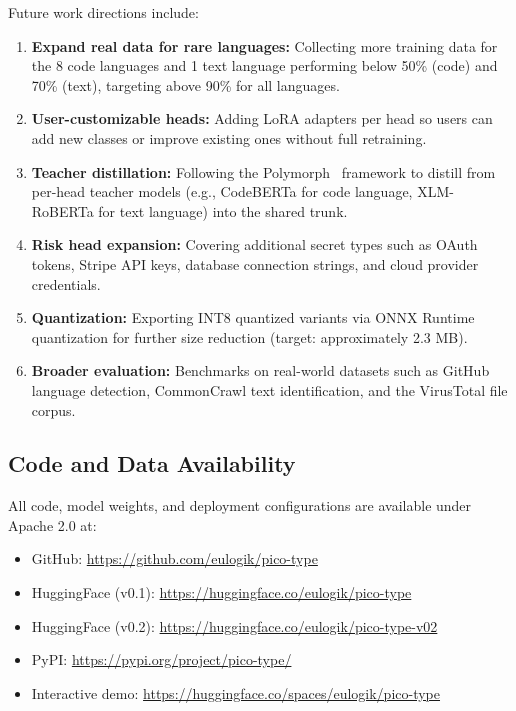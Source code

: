 \documentclass[11pt,a4paper]{article}
\begin{document}
Future work directions include:

\begin{enumerate}[noitemsep]
  \item \textbf{Expand real data for rare languages:} Collecting more training data for the 8 code languages and 1 text language performing below 50\% (code) and 70\% (text), targeting above 90\% for all languages.
  \item \textbf{User-customizable heads:} Adding LoRA adapters per head so users can add new classes or improve existing ones without full retraining.
  \item \textbf{Teacher distillation:} Following the Polymorph~\cite{polymorph} framework to distill from per-head teacher models (e.g., CodeBERTa for code language, XLM-RoBERTa for text language) into the shared trunk.
  \item \textbf{Risk head expansion:} Covering additional secret types such as OAuth tokens, Stripe API keys, database connection strings, and cloud provider credentials.
  \item \textbf{Quantization:} Exporting INT8 quantized variants via ONNX Runtime quantization for further size reduction (target: approximately 2.3 MB).
  \item \textbf{Broader evaluation:} Benchmarks on real-world datasets such as GitHub language detection, CommonCrawl text identification, and the VirusTotal file corpus.
\end{enumerate}

\subsection*{Code and Data Availability}

All code, model weights, and deployment configurations are available under Apache 2.0 at:
\begin{itemize}[noitemsep]
  \item GitHub: \url{https://github.com/eulogik/pico-type}
  \item HuggingFace (v0.1): \url{https://huggingface.co/eulogik/pico-type}
  \item HuggingFace (v0.2): \url{https://huggingface.co/eulogik/pico-type-v02}
  \item PyPI: \url{https://pypi.org/project/pico-type/}
  \item Interactive demo: \url{https://huggingface.co/spaces/eulogik/pico-type}
\end{itemize}
\end{document}
